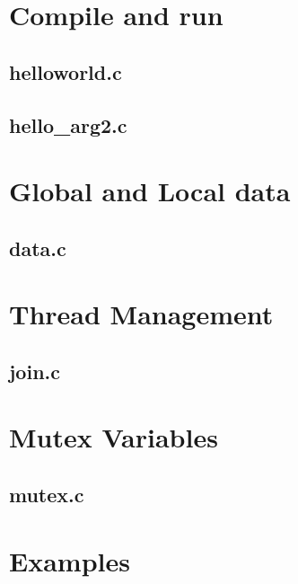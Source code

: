 \chapter{Compile and run}

\section{helloworld.c}



\section{hello_arg2.c}



\chapter{Global and Local data}

\section{data.c}



\chapter{Thread Management}

\section{join.c}



\chapter{Mutex Variables}

\section{mutex.c}
  


\chapter{Examples}

